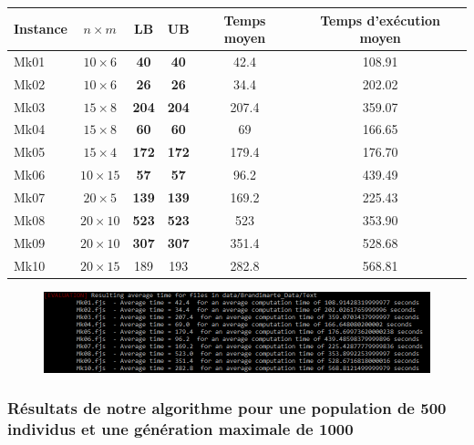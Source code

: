 \begin{table}[!h]
    \renewcommand{\arraystretch}{1.5}
    \centering
    \begin{tabular}{p{} c c c c c}
        Instance & $n \times m$ & LB & UB & Temps moyen & Temps d'exécution moyen \\
         \hline
        Mk01 & $10 \times 6$ & \textbf{40} & \textbf{40} & 42.4 & 108.91 \\
         \hline
        Mk02 & $10 \times 6$ & \textbf{26} & \textbf{26} & 34.4 & 202.02 \\
         \hline
        Mk03 & $15 \times 8$ & \textbf{204} & \textbf{204} & 207.4 & 359.07 \\
         \hline
        Mk04 & $15 \times 8$ & \textbf{60} & \textbf{60} & 69 & 166.65 \\
         \hline
        Mk05 & $15 \times 4$ & \textbf{172} & \textbf{172} & 179.4 & 176.70 \\
         \hline
        Mk06 & $10 \times 15$ & \textbf{57} & \textbf{57} & 96.2 & 439.49 \\
         \hline
        Mk07 & $20 \times 5$ & \textbf{139} & \textbf{139} & 169.2 & 225.43 \\
         \hline
        Mk08 & $20 \times 10$ & \textbf{523} & \textbf{523} & 523 & 353.90 \\
         \hline
        Mk09 & $20 \times 10$ & \textbf{307} & \textbf{307} & 351.4 & 528.68 \\
         \hline
        Mk10 & $20 \times 15$ & 189 & 193 & 282.8 & 568.81 \\
         \hline 
    \end{tabular}
\end{table}

\begin{figure}[!h]
    \centering
    \includegraphics[width=\linewidth]{report/Pictures/brandimarte_200_500.png}
\end{figure}

\newpage

\subsubsection{Résultats de notre algorithme pour une population de 500 individus et une génération maximale de 1000}

